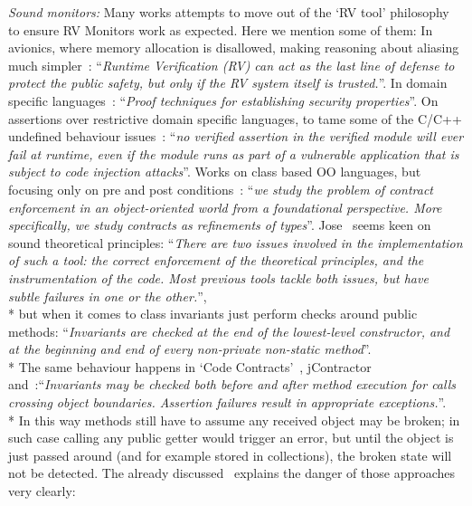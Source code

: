 \noindent\textit{Sound monitors:}
\noindent Many works attempts to move out of the `RV tool' philosophy to ensure RV Monitors work as expected. Here
we mention some of them:
\sepItems
In avionics, where memory allocation is disallowed, making reasoning about aliasing much simpler~\cite{laurent2015assuring}:
``\emph{Runtime Verification (RV) can act as the last line of defense to
protect the public safety, but only if the RV system itself is trusted.}''.
\sepItems
In domain specific languages~\cite{ferrari2002guardians}:
``\emph{Proof techniques for establishing security properties}''.
\sepItems
On assertions over restrictive domain specific languages, to tame some of the C/C++
undefined behaviour issues~\cite{agten2015sound}:
``\emph{no verified assertion in the verified
module will ever fail at runtime, even if the module runs as part of
a vulnerable application that is subject to code injection attacks}''.
\sepItems
Works on class based OO languages, but focusing only on pre and post conditions~\cite{findler2001contract}:
``\emph{we  study  the  problem  of  contract  enforcement in
an object-oriented world from  a foundational perspective.   More
specifically, we study contracts as refinements of types}''.
\sepItems
Jose~\cite{feldman2006jose} seems keen on sound theoretical principles:
``\emph{There are two issues involved
in the implementation of such a tool: the correct enforcement of the theoretical principles, and the instrumentation
of the code. Most previous tools tackle both issues, but have
subtle failures in one or the other.}'',\\*
but when it comes to class invariants just perform checks around public methods:
``\emph{Invariants are checked at the end of the lowest-level constructor,
 and at the beginning and end of every non-private non-static method}''.\\*
The same behaviour happens in `Code Contracts'~\cite{fahndrich2010embedded},
jContractor~\cite{abercrombie2002jcontractor}
and~\cite{tran2003design}:``\emph{Invariants may be checked both before and after
method  execution  for  calls  crossing  object  boundaries.
Assertion  failures  result  in  appropriate  exceptions.}''.\\*
In this way methods still have to assume any received object may be broken; in such case calling any
public getter would trigger an error, but until the object is just passed around
(and for example stored in collections), the broken state will not be detected.
The already discussed~\cite{Gopinathan:2008:RMO:1483018.1483028}
explains the danger of those approaches very clearly:
